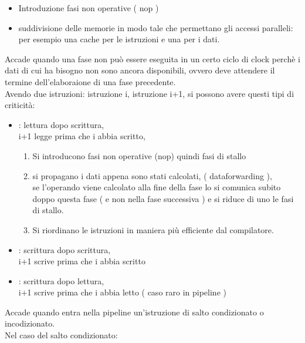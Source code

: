 \documentclass[arch.tex]{subfiles}
\begin{document}
\begin{itemize}
	\item Introduzione fasi non operative ( nop ) 
	\item suddivisione delle memorie in modo tale che permettano gli
		accessi paralleli:\\
		per esempio una cache per le istruzioni e una per i dati.
\end{itemize}

%
\label{par:dipendenza_dai_dati}
Accade quando una fase non può essere eseguita in un certo ciclo di clock 
perchè i dati di cui ha bisogno non sono ancora disponibili, ovvero deve attendere
il termine dell'elaboraione di una fase precedente.\\
Avendo due istruzioni: istruzione i, istruzione i+1, si possono 
avere questi tipi di criticità:

\begin{itemize}
	\item {}: lettura dopo scrittura,\\
		i+1 legge prima che i abbia scritto,\\
		\begin{enumerate}
		\item Si introducono fasi non operative (nop) quindi fasi di stallo
		\item si propagano i dati appena sono stati calcolati, 
			( dataforwarding ),\\
		se l'operando viene calcolato alla fine della fase  
		lo si comunica subito doppo questa fase ( e non nella fase successiva
		  )  e si riduce di uno le fasi di stallo.
		\item Si riordinano le istruzioni in maniera più efficiente dal compilatore.
		\end{enumerate}
	\item {}: scrittura dopo scrittura,\\
		i+1 scrive prima che i abbia scritto
	\item {}: scrittura dopo lettura,\\
		i+1 scrive prima che i abbia letto ( caso raro in pipeline )  
\end{itemize}

%
\label{par:dipendenza_dal_controllo}
Accade quando entra nella pipeline un'istruzione di salto condizionato o incodizionato.\\
Nel caso del salto condizionato:\\
\end{document}
